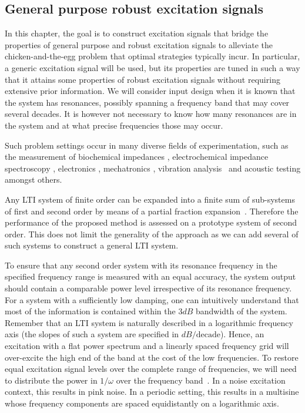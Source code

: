 \subsection{General purpose robust excitation signals}
\label{sec:excitation:intro:approach}
In this chapter, the goal is to construct excitation signals that bridge the properties of general purpose and robust excitation signals to alleviate the chicken-and-the-egg problem that optimal strategies typically incur.
In particular, a generic excitation signal will be used, but its properties are tuned in such a way that it attains some properties of robust excitation signals without requiring extensive prior information.
We will consider input design when it is known that the system has resonances, possibly spanning a frequency band that may cover several decades. 
It is however not necessary to know how many resonances are in the system and at what precise frequencies those may occur.

Such problem settings occur in many diverse fields of experimentation, such as the measurement of biochemical impedances \citep{Bragos2001,Sanchez2011}, electrochemical impedance spectroscopy \citep{Niedostatkiewicz2009,VanGheem2004,Breugelmans2010}, electronics \citep{Munir2011}, mechatronics \citep{Steinbuch1998,Oomen2016}, vibration analysis~\citep{Karnopp1995,Voorhoeve2015SYSID} and acoustic testing \citep{GarciaLopez2014,DAmico2014} amongst others. 

  Any \gls{LTI} system of finite order can be expanded into a finite sum of sub-systems of first and second order by means of a partial fraction expansion~\citep{Oppenheim1983}.
  Therefore the performance of the proposed method is assessed on a prototype system of second order.
  This does not limit the generality of the approach as we can add several of such systems to construct a general \gls{LTI} system.
  
  To ensure that any second order system with its resonance frequency in the specified frequency range is measured with an equal accuracy, the system output should contain a comparable power level irrespective of its resonance frequency.
  For a system with a sufficiently low damping, one can intuitively understand that most of the information is contained within the $3 \unit{dB}$ bandwidth of the system.
  Remember that an \gls{LTI} system is naturally described in a logarithmic frequency axis (the slopes of such a system are specified in $\unit{dB}/\text{decade}$).
  Hence, an excitation with a flat power spectrum and a linearly spaced frequency grid will over-excite the high end of the band at the cost of the low frequencies.
  To restore equal excitation signal levels over the complete range of frequencies, we will need to distribute the power in $1/\omega$ over the frequency band~\citep{Goodwin2006,Goodwin2006GBO}.
  In a noise excitation context, this results in pink noise.
  In a periodic setting, this results in a multisine whose frequency components are spaced equidistantly on a logarithmic axis.
  
